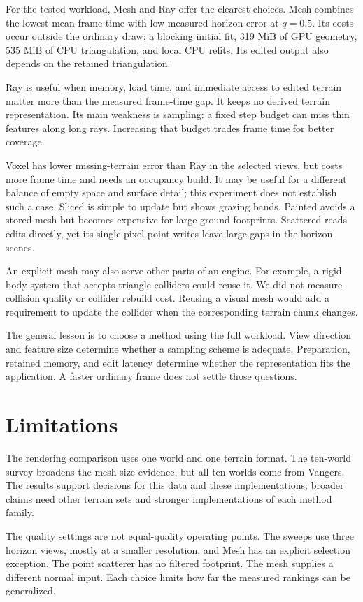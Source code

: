 \documentclass{jcgt}
\begin{document}
For the tested workload, Mesh and Ray offer the clearest choices. Mesh combines the lowest mean frame time with low measured horizon error at $q=0.5$. Its costs occur outside the ordinary draw: a blocking initial fit, 319 MiB of GPU geometry, 535 MiB of CPU triangulation, and local CPU refits. Its edited output also depends on the retained triangulation.

Ray is useful when memory, load time, and immediate access to edited terrain matter more than the measured frame-time gap. It keeps no derived terrain representation. Its main weakness is sampling: a fixed step budget can miss thin features along long rays. Increasing that budget trades frame time for better coverage.

Voxel has lower missing-terrain error than Ray in the selected views, but costs more frame time and needs an occupancy build. It may be useful for a different balance of empty space and surface detail; this experiment does not establish such a case. Sliced is simple to update but shows grazing bands. Painted avoids a stored mesh but becomes expensive for large ground footprints. Scattered reads edits directly, yet its single-pixel point writes leave large gaps in the horizon scenes.

An explicit mesh may also serve other parts of an engine. For example, a rigid-body system that accepts triangle colliders could reuse it. We did not measure collision quality or collider rebuild cost. Reusing a visual mesh would add a requirement to update the collider when the corresponding terrain chunk changes.

The general lesson is to choose a method using the full workload. View direction and feature size determine whether a sampling scheme is adequate. Preparation, retained memory, and edit latency determine whether the representation fits the application. A faster ordinary frame does not settle those questions.

\section{Limitations}\label{sec:limits}

The rendering comparison uses one world and one terrain format. The ten-world survey broadens the mesh-size evidence, but all ten worlds come from Vangers. The results support decisions for this data and these implementations; broader claims need other terrain sets and stronger implementations of each method family.

The quality settings are not equal-quality operating points. The sweeps use three horizon views, mostly at a smaller resolution, and Mesh has an explicit selection exception. The point scatterer has no filtered footprint. The mesh supplies a different normal input. Each choice limits how far the measured rankings can be generalized.
\end{document}
